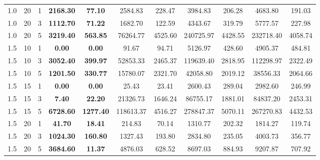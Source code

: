 \begin{tabular}{ccccccccccc}
1.0 & 20 & 1 & \textbf{2168.30} & \textbf{77.10} & 2584.83 & 228.47 & 3984.83 & 206.28 & 4683.80 & 191.03 \\
1.0 & 20 & 3 & \textbf{1112.70} & \textbf{71.22} & 1682.70 & 122.59 & 4343.67 & 319.79 & 5777.57 & 227.98 \\
1.0 & 20 & 5 & \textbf{3219.40} & \textbf{563.85} & 76264.77 & 4525.60 & 240725.97 & 4428.55 & 232718.40 & 4058.74 \\
1.5 & 10 & 1 & \textbf{0.00} & \textbf{0.00} & 91.67 & 94.71 & 5126.97 & 428.60 & 4905.37 & 484.81 \\
1.5 & 10 & 3 & \textbf{3052.40} & \textbf{399.97} & 52853.33 & 2465.37 & 119639.40 & 2818.95 & 112298.97 & 2322.49 \\
1.5 & 10 & 5 & \textbf{1201.50} & \textbf{330.77} & 15780.07 & 2321.70 & 42058.80 & 2019.12 & 38556.33 & 2064.66 \\
1.5 & 15 & 1 & \textbf{0.00} & \textbf{0.00} & 25.43 & 23.41 & 2600.43 & 289.04 & 2982.60 & 246.99 \\
1.5 & 15 & 3 & \textbf{7.40} & \textbf{22.20} & 21326.73 & 1646.24 & 86755.17 & 1881.01 & 84837.20 & 2453.31 \\
1.5 & 15 & 5 & \textbf{6728.60} & \textbf{1277.40} & 118613.37 & 4516.27 & 278847.37 & 5070.11 & 267270.83 & 4432.53 \\
1.5 & 20 & 1 & \textbf{41.70} & \textbf{18.41} & 214.83 & 70.14 & 1310.77 & 202.32 & 1814.27 & 119.74 \\
1.5 & 20 & 3 & \textbf{1024.30} & \textbf{160.80} & 1327.43 & 193.80 & 2834.80 & 235.05 & 4003.73 & 356.77 \\
1.5 & 20 & 5 & \textbf{3684.60} & \textbf{11.37} & 4876.03 & 628.52 & 8697.03 & 884.93 & 9207.87 & 707.92 \\
\bottomrule
\end{tabular}
